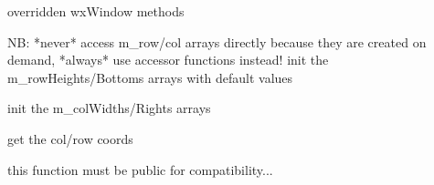 \label{wxgridfit}


overridden wxWindow methods


\label{wxgriddogetbestsize}



\label{wxgridinitrowheights}


NB: *never* access m\_row/col arrays directly because they are created
on demand, *always* use accessor functions instead!
init the m\_rowHeights/Bottoms arrays with default values


\label{wxgridinitcolwidths}


init the m\_colWidths/Rights arrays


\label{wxgridgetcolwidth}


get the col/row coords


\label{wxgridgetcolleft}



\label{wxgridgetcolright}



\label{wxgridgetrowheight}


this function must be public for compatibility...


\label{wxgridgetrowtop}



\label{wxgridgetrowbottom}



\label{wxgridsetorcalccolumnsizes}


